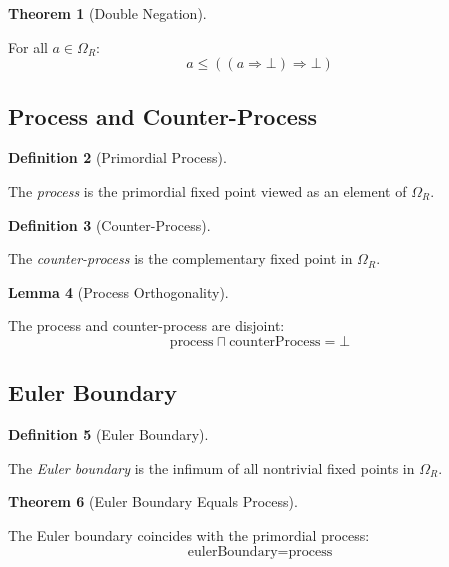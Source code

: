 \documentclass{amsart}
\theoremstyle{definition}
\newtheorem{definition}{Definition}[section]
\newtheorem{theorem}[definition]{Theorem}
\newtheorem{lemma}[definition]{Lemma}
\theoremstyle{remark}
\begin{document}
\begin{theorem}[Double Negation]
\label{thm:double-neg}
\leanok
{}

For all $a \in \Omega_R$:
\[
a \leq ((a \Rightarrow \bot) \Rightarrow \bot)
\]
\end{theorem}

\subsection{Process and Counter-Process}
\label{sec:processes}

\begin{definition}[Primordial Process]
\label{def:process}

The \emph{process} is the primordial fixed point viewed as an element of $\Omega_R$.
\end{definition}

\begin{definition}[Counter-Process]
\label{def:counter-process}

The \emph{counter-process} is the complementary fixed point in $\Omega_R$.
\end{definition}

\begin{lemma}[Process Orthogonality]
\label{lem:process-ortho}
\leanok
{}

The process and counter-process are disjoint:
\[
\text{process} \sqcap \text{counterProcess} = \bot
\]
\end{lemma}

\subsection{Euler Boundary}
\label{sec:euler-boundary}

\begin{definition}[Euler Boundary]
\label{def:euler-boundary}

The \emph{Euler boundary} is the infimum of all nontrivial fixed points in $\Omega_R$.
\end{definition}

\begin{theorem}[Euler Boundary Equals Process]
\label{thm:euler-eq-process}
\leanok
{}

The Euler boundary coincides with the primordial process:
\[
\text{eulerBoundary} = \text{process}
\]
\end{theorem}
\end{document}
